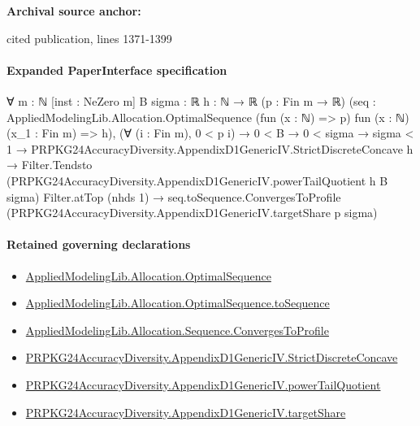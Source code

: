 \documentclass[10pt]{article}
\begin{document}
\textbf{Archival source anchor:} {\footnotesize\raggedright cited publication, lines 1371-\allowbreak{}1399\par}
\paragraph{Expanded PaperInterface specification}
\begin{ReviewVerbatim}
∀ {m : ℕ} [inst : NeZero m] {B sigma : ℝ} {h : ℕ → ℝ} (p : Fin m → ℝ)
  (seq : AppliedModelingLib.Allocation.OptimalSequence (fun (x : ℕ) => p) fun (x : ℕ) (x_1 : Fin m) => h),
  (∀ (i : Fin m), 0 < p i) →
    0 < B →
      0 < sigma →
        sigma < 1 →
          PRPKG24AccuracyDiversity.AppendixD1GenericIV.StrictDiscreteConcave h →
            Filter.Tendsto (PRPKG24AccuracyDiversity.AppendixD1GenericIV.powerTailQuotient h B sigma) Filter.atTop
                (nhds 1) →
              seq.toSequence.ConvergesToProfile (PRPKG24AccuracyDiversity.AppendixD1GenericIV.targetShare p sigma)
\end{ReviewVerbatim}

\paragraph{Retained governing declarations}
\begin{itemize}\raggedright
\item \hyperlink{governing-declaration-de3def91e8620291}{Applied\allowbreak{}Modeling\allowbreak{}Lib.\allowbreak{}Allocation.\allowbreak{}Optimal\allowbreak{}Sequence}
\item \hyperlink{governing-declaration-7a4a864147660f7c}{Applied\allowbreak{}Modeling\allowbreak{}Lib.\allowbreak{}Allocation.\allowbreak{}Optimal\allowbreak{}Sequence.\allowbreak{}to\allowbreak{}Sequence}
\item \hyperlink{governing-declaration-ec09422b2ba8f633}{Applied\allowbreak{}Modeling\allowbreak{}Lib.\allowbreak{}Allocation.\allowbreak{}Sequence.\allowbreak{}Converges\allowbreak{}To\allowbreak{}Profile}
\item \hyperlink{governing-declaration-73f96abb117d1401}{PRPKG24\allowbreak{}Accuracy\allowbreak{}Diversity.\allowbreak{}Appendix\allowbreak{}D1\allowbreak{}Generic\allowbreak{}IV.\allowbreak{}Strict\allowbreak{}Discrete\allowbreak{}Concave}
\item \hyperlink{governing-declaration-809ee66d07783a3a}{PRPKG24\allowbreak{}Accuracy\allowbreak{}Diversity.\allowbreak{}Appendix\allowbreak{}D1\allowbreak{}Generic\allowbreak{}IV.\allowbreak{}power\allowbreak{}Tail\allowbreak{}Quotient}
\item \hyperlink{governing-declaration-6e5145ec5c26e84f}{PRPKG24\allowbreak{}Accuracy\allowbreak{}Diversity.\allowbreak{}Appendix\allowbreak{}D1\allowbreak{}Generic\allowbreak{}IV.\allowbreak{}target\allowbreak{}Share}
\end{itemize}
\end{document}
